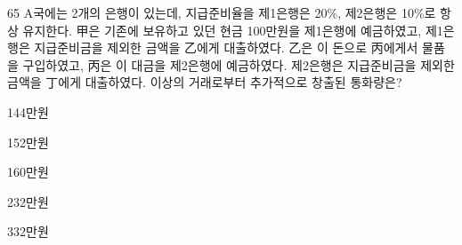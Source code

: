 \begin{question}{65}
A국에는 2개의 은행이 있는데, 지급준비율을 제1은행은 20\%, 제2은행은 10\%로 항상 유지한다. 甲은 기존에 보유하고 있던 현금 100만원을 제1은행에 예금하였고, 제1은행은 지급준비금을 제외한 금액을 乙에게 대출하였다. 乙은 이 돈으로 丙에게서 물품을 구입하였고, 丙은 이 대금을 제2은행에 예금하였다. 제2은행은 지급준비금을 제외한 금액을 丁에게 대출하였다. 이상의 거래로부터 추가적으로 창출된 통화량은?
\begin{choices}
  \item 144만원
  \item 152만원
  \item 160만원
  \item 232만원
  \item 332만원
\end{choices}
\end{question}
